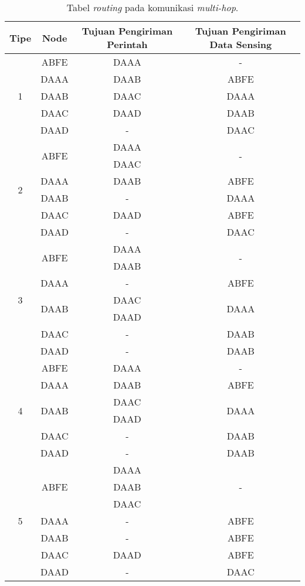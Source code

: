 \begin{table} [h]
	\centering 
	\caption{Tabel \textit{routing} pada komunikasi \textit{multi-hop}.}
	\label{tab:routing_multi_hop}
	\begin{tabular}{|c|c|c|c|}
        \hline
		Tipe & Node & Tujuan Pengiriman Perintah & Tujuan Pengiriman Data Sensing\\
        \hline
	\multirow{5}{*}{1} & ABFE & DAAA & - \\
		\cline{2-4}
		& DAAA & DAAB & ABFE \\
		\cline{2-4}
	    & DAAB & DAAC & DAAA \\
		\cline{2-4}
	    & DAAC & DAAD & DAAB \\
		\cline{2-4}
	    & DAAD & - & DAAC \\
        \hline
        \hline
       	\multirow{6}{*}{2} & \multirow{2}{*}{ABFE} & DAAA & \multirow{2}{*}{-} \\
        & & DAAC & \\
        \cline{2-4}
		& DAAA & DAAB & ABFE \\
		\cline{2-4}
		& DAAB & - & DAAA \\
		\cline{2-4}
		& DAAC & DAAD & ABFE \\
		\cline{2-4}
		& DAAD & - & DAAC \\
		\hline
        \hline
        \multirow{7}{*}{3} & \multirow{2}{*}{ABFE} & DAAA & \multirow{2}{*}{-} \\
        & & DAAB & \\
        \cline{2-4}
		& DAAA & - & ABFE \\
		\cline{2-4}
		& \multirow{2}{*}{DAAB} & DAAC & \multirow{2}{*}{DAAA} \\
		& & DAAD & \\
		\cline{2-4}
		& DAAC & - & DAAB \\
		\cline{2-4}
		& DAAD & - & DAAB \\
		\hline
        \hline
    \multirow{6}{*}{4}   & ABFE & DAAA & - \\
		\cline{2-4}
	&	DAAA & DAAB & ABFE \\
		\cline{2-4}
	&	\multirow{2}{*}{DAAB} & DAAC & \multirow{2}{*}{DAAA} \\
	&	 & DAAD & \\
		\cline{2-4}
	&	DAAC & - & DAAB \\
		\cline{2-4}
	&	DAAD & - & DAAB \\
		\hline
        \hline
       \multirow{7}{*}{5} & \multirow{3}{*}{ABFE} & DAAA & \multirow{3}{*}{-} \\
       & & DAAB &\\
       & & DAAC &\\
		\cline{2-4}
		&DAAA & - & ABFE \\
		\cline{2-4}
		&DAAB & - & ABFE \\
		\cline{2-4}
	&	DAAC & DAAD & ABFE \\
		\cline{2-4}
		&DAAD & - & DAAC \\
		\hline
        \hline
	\end{tabular} 
\end{table}
 
